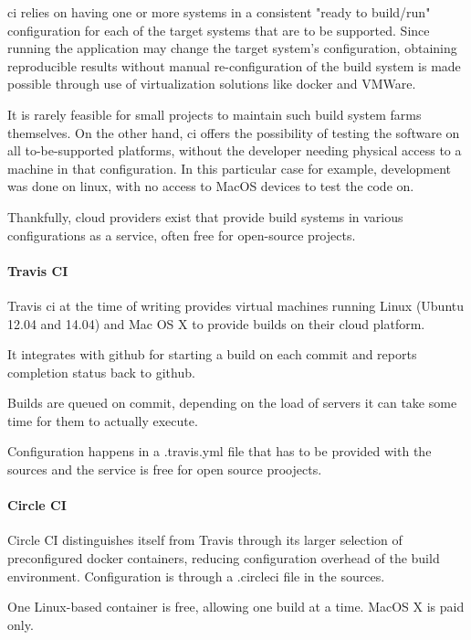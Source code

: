 \gls{ci} relies on having one or more systems in a consistent "ready to build/run" configuration for each of the target systems that are to be supported. Since running the application may change the target system's configuration, obtaining reproducible results without manual re-configuration of the build system is made possible through use of virtualization solutions like docker and VMWare.

It is rarely feasible for small projects to maintain such build system farms themselves. On the other hand, \gls{ci} offers the possibility of testing the software on all to-be-supported platforms, without the developer needing physical access to a machine in that configuration. In this particular case for example, development was done on linux, with no access to MacOS devices to test the code on.

Thankfully, \gls{cloud} providers exist that provide build systems in various configurations as a service, often free for open-source projects.

\paragraph{Travis CI}
Travis \gls{ci} at the time of writing provides virtual machines running Linux (Ubuntu 12.04 and 14.04) and Mac OS X to provide builds on their \gls{cloud} platform.

It integrates with github for starting a build on each commit and reports completion status back to github.

Builds are queued on commit, depending on the load of servers it can take some time for them to actually execute.

Configuration happens in a .travis.yml file that has to be provided with the sources and the service is free for open source proojects.

\paragraph{Circle CI}
Circle CI distinguishes itself from Travis through its larger selection of preconfigured docker containers, reducing configuration overhead of the build environment.
Configuration is through a .circleci file in the sources.

One Linux-based container is free, allowing one build at a time. MacOS X is paid only.

